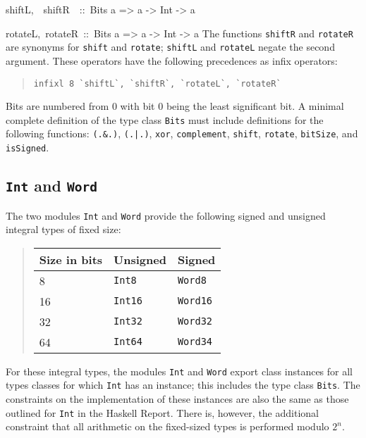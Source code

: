\documentclass[a4paper,twoside]{article}
\makeatletter
\newcommand{\code}[1]{\texttt{#1}}      %
\newenvironment{codedesc}{%
  \list{}{\labelwidth\z@
    \let\makelabel\codedesclabel}
  }{%
  \endlist
  }
\newcommand*{\codedesclabel}[1]{%
  \hspace{-\leftmargin}
  \parbox[b]{\labelwidth}{\makebox[0pt][l]{\code{#1}}\\}\hfil\relax
  }
\newcommand{\combineitems}{\vspace*{-\itemsep}\vspace*{-\parsep}\vspace*{-1em}}
\makeatother
\begin{document}
\begin{codedesc}
\item[shiftL,~~shiftR~~::\ Bits a => a -> Int -> a]
\item[rotateL,~rotateR~::\ Bits a => a -> Int -> a]\combineitems The functions
  \code{shiftR} and \code{rotateR} are synonyms for \code{shift} and
  \code{rotate}; \code{shiftL} and \code{rotateL} negate the second argument.
  These operators have the following precedences as infix operators:
  \begin{quote}
\begin{verbatim}
infixl 8 `shiftL`, `shiftR`, `rotateL`, `rotateR`
\end{verbatim}
  \end{quote}

\end{codedesc}
%
Bits are numbered from 0 with bit 0 being the least significant bit.  A
minimal complete definition of the type class \code{Bits} must include
definitions for the following functions: \code{(.\&.)}, \code{(.|.)},
\code{xor}, \code{complement}, \code{shift}, \code{rotate}, \code{bitSize},
and \code{isSigned}. 

\subsection{\code{Int} and \code{Word}}
\label{sec:Int-Word}

The two modules \code{Int} and \code{Word} provide the following signed and
unsigned integral types of fixed size:
%
\begin{quote}
  \begin{tabular}{|l|l|l|}
    \hline
    Size in bits & Unsigned     & Signed\\\hline\hline
    8            & \code{Int8}  & \code{Word8}\\
    16           & \code{Int16} & \code{Word16}\\
    32           & \code{Int32} & \code{Word32}\\
    64           & \code{Int64} & \code{Word34}\\
    \hline
  \end{tabular}
\end{quote}
%
For these integral types, the modules \code{Int} and \code{Word} export class
instances for all types classes for which \code{Int} has an instance; this
includes the type class \code{Bits}.  The constraints on the implementation of
these instances are also the same as those outlined for \code{Int} in the
Haskell Report.  There is, however, the additional constraint that all
arithmetic on the fixed-sized types is performed modulo \(2^n\).
\end{document}
